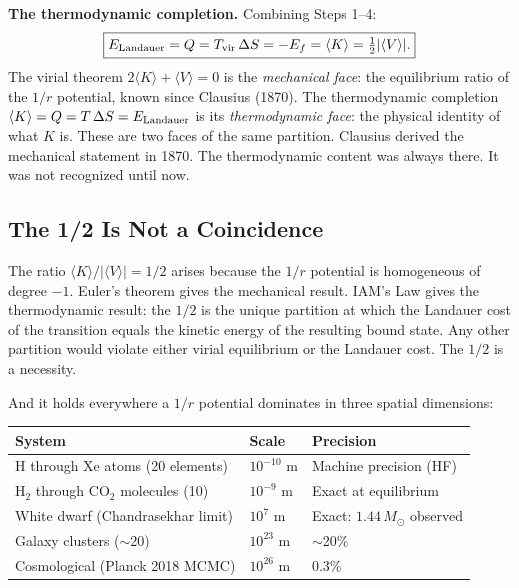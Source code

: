 \documentclass[12pt,a4paper]{article}
\begin{document}
\textbf{The thermodynamic completion.} Combining Steps 1--4:
\begin{equation}
\boxed{E_{\rm Landauer} = Q = T_{\rm vir}\,\Delta S
= -E_f = \langle K \rangle = \tfrac{1}{2}|\langle V \rangle|.}
\label{eq:completion}
\end{equation}
The virial theorem $2\langle K \rangle + \langle V \rangle = 0$ is the
\textit{mechanical face}: the equilibrium ratio of the $1/r$ potential, known
since Clausius (1870). The thermodynamic completion
$\langle K \rangle = Q = T\,\Delta S = E_{\rm Landauer}$
is its \textit{thermodynamic face}: the physical identity of what $K$ is. These
are two faces of the same partition. Clausius derived the mechanical statement
in 1870. The thermodynamic content was always there. It was not recognized
until now.

\subsection{The 1/2 Is Not a Coincidence}

The ratio $\langle K \rangle / |\langle V \rangle| = 1/2$ arises because the
$1/r$ potential is homogeneous of degree $-1$. Euler's theorem gives the
mechanical result. IAM's Law gives the thermodynamic result: the $1/2$ is the
unique partition at which the Landauer cost of the transition equals the kinetic
energy of the resulting bound state. Any other partition would violate either
virial equilibrium or the Landauer cost. The $1/2$ is a necessity.

And it holds everywhere a $1/r$ potential dominates in three spatial dimensions:

\begin{center}
\begin{tabular}{lll}
\toprule
\textbf{System} & \textbf{Scale} & \textbf{Precision} \\
\midrule
H through Xe atoms (20 elements) & $10^{-10}$ m & Machine precision (HF) \\
H$_2$ through CO$_2$ molecules (10) & $10^{-9}$ m & Exact at equilibrium \\
White dwarf (Chandrasekhar limit) & $10^{7}$ m & Exact: $1.44\,M_\odot$ observed \\
Galaxy clusters ($\sim$20) & $10^{23}$ m & $\sim$20\% \\
Cosmological (Planck 2018 MCMC) & $10^{26}$ m & 0.3\% \\
\bottomrule
\end{tabular}
\end{center}
\end{document}
